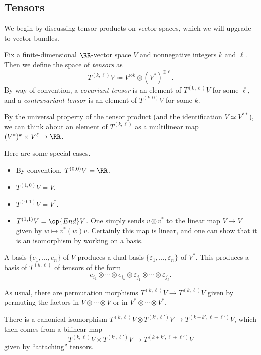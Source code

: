 \documentclass[../notes.tex]{subfiles}
\begin{document}
\subsection{Tensors}
We begin by discussing tensor products on vector spaces, which we will upgrade to vector bundles.
\begin{definition}[tensor]
	Fix a finite-dimensional $\RR$-vector space $V$ and nonnegative integers $k$ and $\ell$. Then we define the space of \textit{tensors} as
	\[T^{(k,\ell)}V\coloneqq V^{\otimes k}\otimes (V^*)^{\otimes\ell}.\]
	By way of convention, a \textit{covariant tensor} is an element of $T^{(0,\ell)}V$ for some $\ell$, and a \textit{contravariant tensor} is an element of $T^{(k,0)}V$ for some $k$.
\end{definition}
By the universal property of the tensor product (and the identification $V\simeq V^{**}$), we can think about an element of $T^{(k,\ell)}$ as a multilinear map $(V^*)^{k}\times V^\ell\to\RR$.
\begin{example}
	Here are some special cases.
	\begin{itemize}
		\item By convention, $T^{(0,0)}V=\RR$.
		\item $T^{(1,0)}V=V$.
		\item $T^{(0,1)}V=V^*$.
		\item $T^{(1,1)}V=\op{End}V$. One simply sends $v\otimes v^*$ to the linear map $V\to V$ given by $w\mapsto v^*(w)v$. Certainly this map is linear, and one can show that it is an isomorphism by working on a basis.
	\end{itemize}
\end{example}
\begin{remark}
	A basis $\{e_1,\ldots,e_n\}$ of $V$ produces a dual basis $\{\varepsilon_1,\ldots,\varepsilon_n\}$ of $V^*$. This produces a basis of $T^{(k,\ell)}$ of tensors of the form
	\[e_{i_1}\otimes\cdots\otimes e_{i_k}\otimes\varepsilon_{j_1}\otimes\cdots\otimes\varepsilon_{j_\ell}.\]
\end{remark}
\begin{remark}
	As usual, there are permutation morphisms $T^{(k,\ell)}V\to T^{(k,\ell)}V$ given by permuting the factors in $V\otimes\cdots\otimes V$ or in $V^*\otimes\cdots\otimes V^*$.
\end{remark}
\begin{remark}
	There is a canonical isomorphism $T^{(k,\ell)}V\otimes T^{(k',\ell')}V\to T^{(k+k',\ell+\ell')}V$, which then comes from a bilinear map
	\[T^{(k,\ell)}V\times T^{(k',\ell')}V\to T^{(k+k',\ell+\ell')}V\]
	given by ``attaching'' tensors.
\end{remark}
\end{document}
